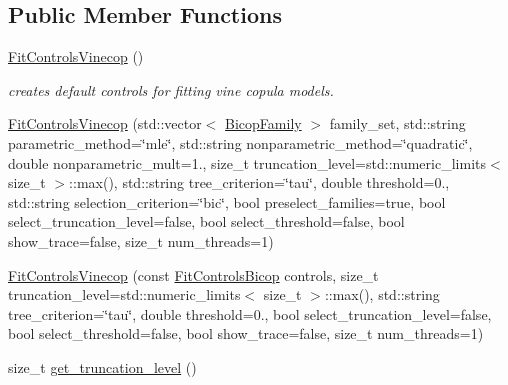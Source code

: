 \subsection*{Public Member Functions}
\begin{DoxyCompactItemize}
\item 
\hyperlink{classvinecopulib_1_1_fit_controls_vinecop_ad101d135c8d8fe66046d931947f45bef}{Fit\+Controls\+Vinecop} ()\hypertarget{classvinecopulib_1_1_fit_controls_vinecop_ad101d135c8d8fe66046d931947f45bef}{}\label{classvinecopulib_1_1_fit_controls_vinecop_ad101d135c8d8fe66046d931947f45bef}

\begin{DoxyCompactList}\small\item\em creates default controls for fitting vine copula models. \end{DoxyCompactList}\item 
\hyperlink{classvinecopulib_1_1_fit_controls_vinecop_a49c04024ca2d54bc45c7edada869b00b}{Fit\+Controls\+Vinecop} (std\+::vector$<$ \hyperlink{namespacevinecopulib_a42e95cc06d33896199caab0c11ad44f3}{Bicop\+Family} $>$ family\+\_\+set, std\+::string parametric\+\_\+method=\char`\"{}mle\char`\"{}, std\+::string nonparametric\+\_\+method=\char`\"{}quadratic\char`\"{}, double nonparametric\+\_\+mult=1., size\+\_\+t truncation\+\_\+level=std\+::numeric\+\_\+limits$<$ size\+\_\+t $>$\+::max(), std\+::string tree\+\_\+criterion=\char`\"{}tau\char`\"{}, double threshold=0., std\+::string selection\+\_\+criterion=\char`\"{}bic\char`\"{}, bool preselect\+\_\+families=true, bool select\+\_\+truncation\+\_\+level=false, bool select\+\_\+threshold=false, bool show\+\_\+trace=false, size\+\_\+t num\+\_\+threads=1)
\item 
\hyperlink{classvinecopulib_1_1_fit_controls_vinecop_a90e45f56af983c9b2ad4f85081f527ec}{Fit\+Controls\+Vinecop} (const \hyperlink{classvinecopulib_1_1_fit_controls_bicop}{Fit\+Controls\+Bicop} controls, size\+\_\+t truncation\+\_\+level=std\+::numeric\+\_\+limits$<$ size\+\_\+t $>$\+::max(), std\+::string tree\+\_\+criterion=\char`\"{}tau\char`\"{}, double threshold=0., bool select\+\_\+truncation\+\_\+level=false, bool select\+\_\+threshold=false, bool show\+\_\+trace=false, size\+\_\+t num\+\_\+threads=1)
\end{DoxyCompactItemize}
{\bf }\par
\begin{DoxyCompactItemize}
\item 
size\+\_\+t \hyperlink{classvinecopulib_1_1_fit_controls_vinecop_afa52dd1f64f6a89ba59ad80374c268a0}{get\+\_\+truncation\+\_\+level} ()
\end{DoxyCompactItemize}



